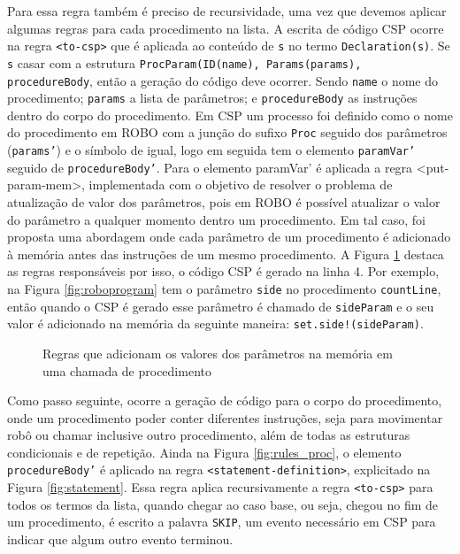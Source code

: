 Para essa regra também é preciso de recursividade, uma vez que devemos aplicar algumas regras para cada procedimento na lista. A escrita de código CSP ocorre na regra \texttt{<to-csp>} que é aplicada ao conteúdo de \texttt{s} no termo \texttt{Declaration(s)}. Se \texttt{s} casar com a estrutura \texttt{ProcParam(ID(name), Params(params), procedureBody}, então a geração do código deve ocorrer. Sendo \texttt{name} o nome do procedimento; \texttt{params} a lista de parâmetros; e \texttt{procedureBody} as instruções dentro do corpo do procedimento. Em CSP um processo foi definido como o nome do procedimento em ROBO com a junção do sufixo \texttt{Proc} seguido dos parâmetros (\texttt{params'}) e o símbolo de igual, logo em seguida tem o elemento \texttt{paramVar'} seguido de \texttt{procedureBody'}. Para o elemento paramVar' é aplicada a regra <put-param-mem>, implementada com o objetivo de resolver o problema de atualização de valor dos parâmetros, pois em ROBO é possível atualizar o valor do parâmetro a qualquer momento dentro um procedimento. Em tal caso, foi proposta uma abordagem onde cada parâmetro de um procedimento é adicionado à memória antes das instruções de um mesmo procedimento. A Figura \ref{fig:put_proc} destaca as regras responsáveis por isso, o código CSP é gerado na linha 4. Por exemplo, na Figura \ref{fig:roboprogram} tem o parâmetro \texttt{side} no procedimento \texttt{countLine}, então quando o CSP é gerado esse parâmetro é chamado de \texttt{sideParam} e o seu valor é adicionado na memória da seguinte maneira: \texttt{set.side!(sideParam)}.

\begin{figure}[h]
\centering
\caption{Regras que adicionam os valores dos parâmetros na memória em uma chamada de procedimento}

\label{fig:put_proc}
\end{figure}

Como passo seguinte, ocorre a geração de código para o corpo do procedimento, onde um procedimento poder conter diferentes instruções, seja para movimentar robô ou chamar inclusive outro procedimento, além de todas as estruturas condicionais e de repetição. Ainda na Figura \ref{fig:rules_proc}, o elemento \texttt{procedureBody'} é aplicado na regra \texttt{<statement-definition>}, explicitado na Figura \ref{fig:statement}. Essa regra aplica recursivamente a regra \texttt{<to-csp>} para todos os termos da lista, quando chegar ao caso base, ou seja, chegou no fim de um procedimento, é escrito a palavra \texttt{SKIP}, um evento necessário em CSP para indicar que algum outro evento terminou.

